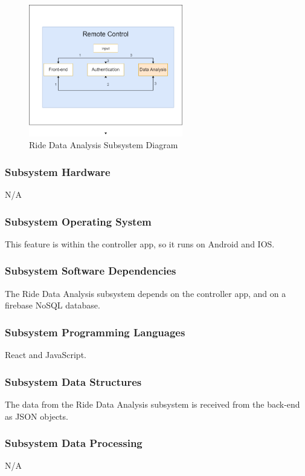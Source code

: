 \begin{figure}[h!]
	\centering
 	\includegraphics[width=0.60\textwidth]{images/dataAnalysis.png} %
 \caption{Ride Data Analysis Subsystem Diagram} %
\end{figure}

\subsubsection{Subsystem Hardware}
N/A

\subsubsection{Subsystem Operating System}
This feature is within the controller app, so it runs on Android and IOS.

\subsubsection{Subsystem Software Dependencies}
The Ride Data Analysis subsystem depends on the controller app, and on a firebase NoSQL database.

\subsubsection{Subsystem Programming Languages}
React and JavaScript.

\subsubsection{Subsystem Data Structures}
The data from the Ride Data Analysis subsystem is received from the back-end as JSON objects.

\subsubsection{Subsystem Data Processing}
N/A

